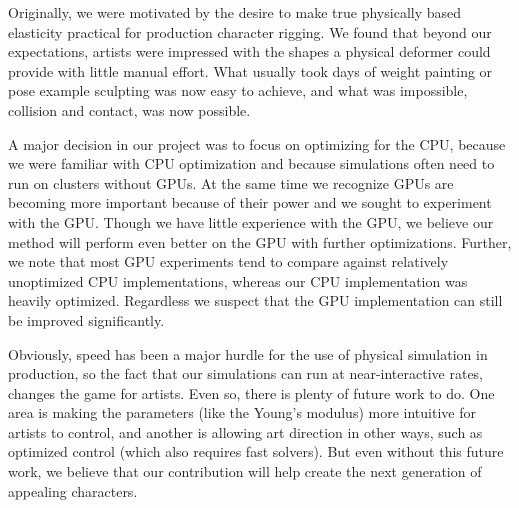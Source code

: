 
Originally, we were motivated by the desire to make true physically based
elasticity practical for production character rigging. We found that beyond our
expectations, artists were impressed with the shapes a physical deformer could
provide with little manual effort. What usually took days of weight
painting or pose example sculpting was now easy to achieve, and what was
impossible, collision and contact, was now possible.

A major decision in our project was to focus on optimizing for the CPU,
because we were familiar with CPU optimization and because
simulations often need to run on clusters without GPUs.  At the same
time we recognize GPUs are becoming more important because of their power and we
sought to experiment with the GPU. Though we have little experience with the
GPU, we believe our method will perform even better on the GPU with further
optimizations. Further, we note that most GPU experiments tend to compare
against relatively unoptimized CPU implementations, whereas our CPU
implementation was heavily optimized. Regardless we suspect that the GPU
implementation can still be improved significantly. 

Obviously, speed has been a major hurdle for the use of physical simulation in
production, so the fact that our simulations can run at near-interactive rates,
changes the game for artists. Even so, there is plenty of future work to do. One
area is making the parameters (like the Young's modulus) more intuitive for
artists to control, and another is allowing art direction in other ways, such as optimized
control (which also requires fast solvers).  But even without this future work, we
believe that our contribution will help create the next generation of appealing
characters. 

